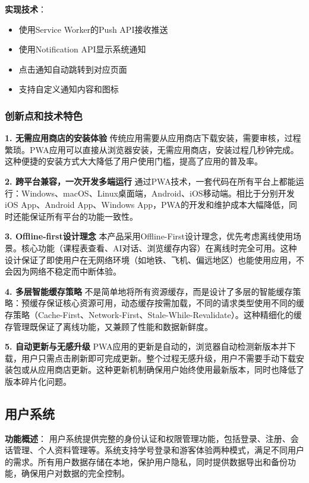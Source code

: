 \documentclass[12pt,a4paper]{article}
\begin{document}
\textbf{实现技术}：
\begin{itemize}
    \item 使用Service Worker的Push API接收推送
    \item 使用Notification API显示系统通知
    \item 点击通知自动跳转到对应页面
    \item 支持自定义通知内容和图标
\end{itemize}

\subsubsection{创新点和技术特色}

\textbf{1. 无需应用商店的安装体验}
传统应用需要从应用商店下载安装，需要审核，过程繁琐。PWA应用可以直接从浏览器安装，无需应用商店，安装过程几秒钟完成。这种便捷的安装方式大大降低了用户使用门槛，提高了应用的普及率。

\textbf{2. 跨平台兼容，一次开发多端运行}
通过PWA技术，一套代码在所有平台上都能运行：Windows、macOS、Linux桌面端，Android、iOS移动端。相比于分别开发iOS App、Android App、Windows App，PWA的开发和维护成本大幅降低，同时还能保证所有平台的功能一致性。

\textbf{3. Offline-first设计理念}
本产品采用Offline-First设计理念，优先考虑离线使用场景。核心功能（课程表查看、AI对话、浏览缓存内容）在离线时完全可用。这种设计保证了即使用户在无网络环境（如地铁、飞机、偏远地区）也能使用应用，不会因为网络不稳定而中断体验。

\textbf{4. 多层智能缓存策略}
不是简单地将所有资源缓存，而是设计了多层的智能缓存策略：预缓存保证核心资源可用，动态缓存按需加载，不同的请求类型使用不同的缓存策略（Cache-First、Network-First、Stale-While-Revalidate）。这种精细化的缓存管理既保证了离线功能，又兼顾了性能和数据新鲜度。

\textbf{5. 自动更新与无感升级}
PWA应用的更新是自动的，浏览器自动检测新版本并下载，用户只需点击刷新即可完成更新。整个过程无感升级，用户不需要手动下载安装包或从应用商店更新。这种更新机制确保用户始终使用最新版本，同时也降低了版本碎片化问题。

\subsection{用户系统}

\textbf{功能概述}：
用户系统提供完整的身份认证和权限管理功能，包括登录、注册、会话管理、个人资料管理等。系统支持学号登录和游客体验两种模式，满足不同用户的需求。所有用户数据存储在本地，保护用户隐私，同时提供数据导出和备份功能，确保用户对数据的完全控制。
\end{document}
